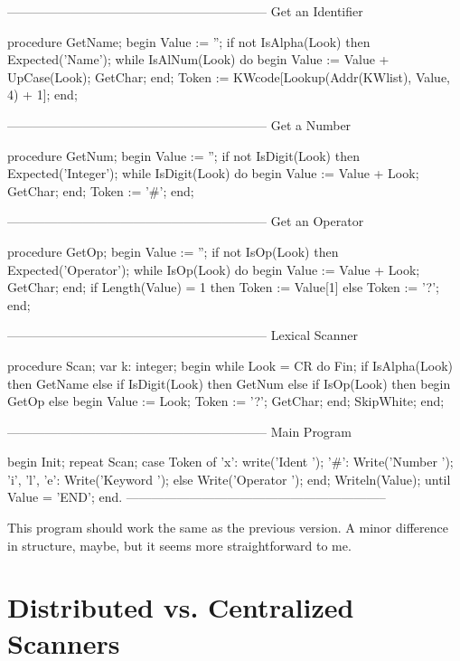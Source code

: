 \documentclass[float=false, crop=false]{standalone}
\begin{document}
\begin{code}
{--------------------------------------------------------------}
{ Get an Identifier }

procedure GetName;
begin
   Value := '';
   if not IsAlpha(Look) then Expected('Name');
   while IsAlNum(Look) do begin
     Value := Value + UpCase(Look);
     GetChar;
   end;
   Token := KWcode[Lookup(Addr(KWlist), Value, 4) + 1];
end;


{--------------------------------------------------------------}
{ Get a Number }

procedure GetNum;
begin
   Value := '';
   if not IsDigit(Look) then Expected('Integer');
   while IsDigit(Look) do begin
     Value := Value + Look;
     GetChar;
   end;
   Token := '#';
end;


{--------------------------------------------------------------}
{ Get an Operator }

procedure GetOp;
begin
   Value := '';
   if not IsOp(Look) then Expected('Operator');
   while IsOp(Look) do begin
     Value := Value + Look;
     GetChar;
   end;
   if Length(Value) = 1 then
      Token := Value[1]
   else
      Token := '?';
end;


{--------------------------------------------------------------}
{ Lexical Scanner }

procedure Scan;
var k: integer;
begin
   while Look = CR do
      Fin;
   if IsAlpha(Look) then
      GetName
   else if IsDigit(Look) then
      GetNum
   else if IsOp(Look) then begin
      GetOp
   else begin
      Value := Look;
      Token := '?';
      GetChar;
   end;
   SkipWhite;
end;


{--------------------------------------------------------------}
{ Main Program }


begin
   Init;
   repeat
      Scan;
      case Token of
        'x': write('Ident ');
        '#': Write('Number ');
        'i', 'l', 'e': Write('Keyword ');
        else Write('Operator ');
      end;
      Writeln(Value);
   until Value = 'END';
end.
{--------------------------------------------------------------}
\end{code}

This program should work the same as the previous version. A minor difference in
structure, maybe, but it seems more straightforward to me.


\section{Distributed vs. Centralized Scanners}
\end{document}
